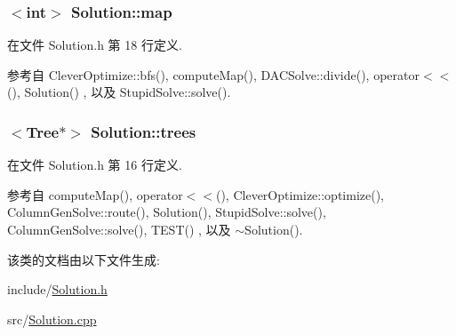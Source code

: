 \subsubsection[{\texorpdfstring{map}{map}}]{$<$int$>$ Solution\+::map}\hypertarget{classSolution_ae89ccd74484f2c87afa05b16f8ee5bf6}{}\label{classSolution_ae89ccd74484f2c87afa05b16f8ee5bf6}


在文件 Solution.\+h 第 18 行定义.



参考自 Clever\+Optimize\+::bfs(), compute\+Map(), D\+A\+C\+Solve\+::divide(), operator$<$$<$(), Solution() , 以及 Stupid\+Solve\+::solve().

\subsubsection[{\texorpdfstring{trees}{trees}}]{$<${\bf Tree}$\ast$$>$ Solution\+::trees}\hypertarget{classSolution_a554205b5c578add14d2d7836042215d8}{}\label{classSolution_a554205b5c578add14d2d7836042215d8}


在文件 Solution.\+h 第 16 行定义.



参考自 compute\+Map(), operator$<$$<$(), Clever\+Optimize\+::optimize(), Column\+Gen\+Solve\+::route(), Solution(), Stupid\+Solve\+::solve(), Column\+Gen\+Solve\+::solve(), T\+E\+S\+T() , 以及 $\sim$\+Solution().



该类的文档由以下文件生成\+:\begin{DoxyCompactItemize}
\item 
include/\hyperlink{Solution_8h}{Solution.\+h}\item 
src/\hyperlink{Solution_8cpp}{Solution.\+cpp}\end{DoxyCompactItemize}
